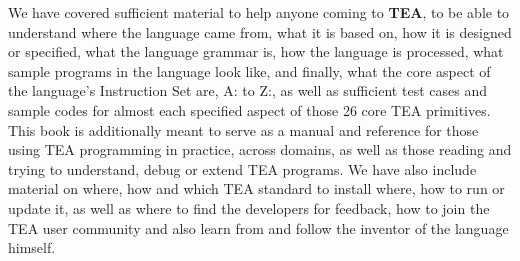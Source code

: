 \documentclass[a4paper, 18pt]{book} %
\begin{document}


We have covered sufficient material to help anyone coming to \textbf{TEA}, to be able to understand where the language came from, what it is based on, how it is designed or specified, what the language grammar is, how the language is processed, what sample programs in the language look like, and finally, what the core aspect of the language's Instruction Set are, A: to Z:, as well as sufficient test cases and sample codes for almost each specified aspect of those 26 core TEA primitives. This book is additionally meant to serve as a manual and reference for those using TEA programming in practice, across domains, as well as those reading and trying to understand, debug or extend TEA programs. We have also include material on where, how and which TEA standard to install where, how to run or update it, as well as where to find the developers for feedback, how to join the TEA user community and also learn from and follow the inventor of the language himself.




\begin{appendices}





\end{appendices}

%






\vspace{5cm}
\\
\end{document}
